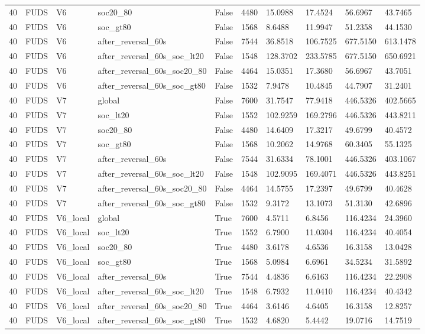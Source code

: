 \begin{tabular}{llllllllll}
40 & FUDS & V6 & soc20\_80 & False & 4480 & 15.0988 & 17.4524 & 56.6967 & 43.7465 \\
40 & FUDS & V6 & soc\_gt80 & False & 1568 & 8.6488 & 11.9947 & 51.2358 & 44.1530 \\
40 & FUDS & V6 & after\_reversal\_60s & False & 7544 & 36.8518 & 106.7525 & 677.5150 & 613.1478 \\
40 & FUDS & V6 & after\_reversal\_60s\_soc\_lt20 & False & 1548 & 128.3702 & 233.5785 & 677.5150 & 650.6921 \\
40 & FUDS & V6 & after\_reversal\_60s\_soc20\_80 & False & 4464 & 15.0351 & 17.3680 & 56.6967 & 43.7051 \\
40 & FUDS & V6 & after\_reversal\_60s\_soc\_gt80 & False & 1532 & 7.9478 & 10.4845 & 44.7907 & 31.2401 \\
40 & FUDS & V7 & global & False & 7600 & 31.7547 & 77.9418 & 446.5326 & 402.5665 \\
40 & FUDS & V7 & soc\_lt20 & False & 1552 & 102.9259 & 169.2796 & 446.5326 & 443.8211 \\
40 & FUDS & V7 & soc20\_80 & False & 4480 & 14.6409 & 17.3217 & 49.6799 & 40.4572 \\
40 & FUDS & V7 & soc\_gt80 & False & 1568 & 10.2062 & 14.9768 & 60.3405 & 55.1325 \\
40 & FUDS & V7 & after\_reversal\_60s & False & 7544 & 31.6334 & 78.1001 & 446.5326 & 403.1067 \\
40 & FUDS & V7 & after\_reversal\_60s\_soc\_lt20 & False & 1548 & 102.9095 & 169.4071 & 446.5326 & 443.8251 \\
40 & FUDS & V7 & after\_reversal\_60s\_soc20\_80 & False & 4464 & 14.5755 & 17.2397 & 49.6799 & 40.4628 \\
40 & FUDS & V7 & after\_reversal\_60s\_soc\_gt80 & False & 1532 & 9.3172 & 13.1073 & 51.3130 & 42.6896 \\
40 & FUDS & V6\_local & global & True & 7600 & 4.5711 & 6.8456 & 116.4234 & 24.3960 \\
40 & FUDS & V6\_local & soc\_lt20 & True & 1552 & 6.7900 & 11.0304 & 116.4234 & 40.4054 \\
40 & FUDS & V6\_local & soc20\_80 & True & 4480 & 3.6178 & 4.6536 & 16.3158 & 13.0428 \\
40 & FUDS & V6\_local & soc\_gt80 & True & 1568 & 5.0984 & 6.6961 & 34.5234 & 31.5892 \\
40 & FUDS & V6\_local & after\_reversal\_60s & True & 7544 & 4.4836 & 6.6163 & 116.4234 & 22.2908 \\
40 & FUDS & V6\_local & after\_reversal\_60s\_soc\_lt20 & True & 1548 & 6.7932 & 11.0410 & 116.4234 & 40.4342 \\
40 & FUDS & V6\_local & after\_reversal\_60s\_soc20\_80 & True & 4464 & 3.6146 & 4.6405 & 16.3158 & 12.8257 \\
40 & FUDS & V6\_local & after\_reversal\_60s\_soc\_gt80 & True & 1532 & 4.6820 & 5.4442 & 19.0716 & 14.7519 \\
\hline
\end{tabular}
